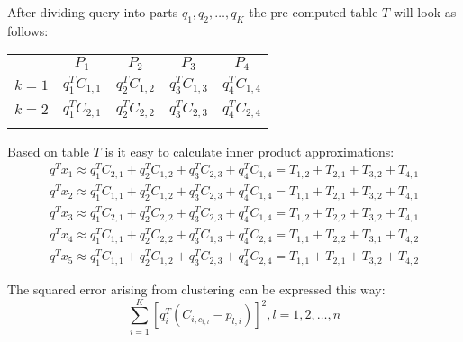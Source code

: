 After dividing query into parts $q_1, q_2, \ldots, q_K$ the pre-computed table $T$ will look as follows:
\renewcommand{\arraystretch}{1.6}
\begin{center}
\begin{tabular}{c|c|c|c|c|}
\multicolumn{1}{r}{} & \multicolumn{1}{c}{$P_{1}$} & \multicolumn{1}{c}{$P_{2}$}
& \multicolumn{1}{c}{$P_{3}$} & \multicolumn{1}{c}{$P_{4}$} \\
\hhline{~----}
$k = 1$ & $ q_1^T C_{1,1} $ & $ q_2^T C_{1,2} $ & $ q_3^T C_{1,3} $ & $ q_4^T C_{1,4} $\\
\hhline{~----}
$k = 2$ & $ q_1^T C_{2,1} $ & $ q_2^T C_{2,2} $ & $ q_3^T C_{2,3} $ & $ q_4^T C_{2,4} $\\
\hhline{~----}
\end{tabular}
\end{center}

\smallskip

Based on table $T$ is it easy to calculate inner product approximations:
\begin{gather*}
 q^T x_1 \approx q_1^T C_{2,1} + q_2^T C_{1,2} + q_3^T C_{2,3} + q_4^T C_{1,4} = T_{1,2} + T_{2,1} + T_{3,2} + T_{4,1} \\
 q^T x_2 \approx q_1^T C_{1,1} + q_2^T C_{1,2} + q_3^T C_{2,3} + q_4^T C_{1,4} = T_{1,1} + T_{2,1} + T_{3,2} + T_{4,1} \\
 q^T x_3 \approx q_1^T C_{2,1} + q_2^T C_{2,2} + q_3^T C_{2,3} + q_4^T C_{1,4} = T_{1,2} + T_{2,2} + T_{3,2} + T_{4,1} \\
 q^T x_4 \approx q_1^T C_{1,1} + q_2^T C_{2,2} + q_3^T C_{1,3} + q_4^T C_{2,4} = T_{1,1} + T_{2,2} + T_{3,1} + T_{4,2} \\
 q^T x_5 \approx q_1^T C_{1,1} + q_2^T C_{1,2} + q_3^T C_{2,3} + q_4^T C_{2,4} = T_{1,1} + T_{2,1} + T_{3,2} + T_{4,2}
\end{gather*}

The squared error arising from clustering can be expressed this way:
$$ \sum_{i=1}^{K}  [q_{i}^{T} (C_{i, c_{i,l}} - p_{l,i})]^2, l = 1, 2, \ldots, n$$
